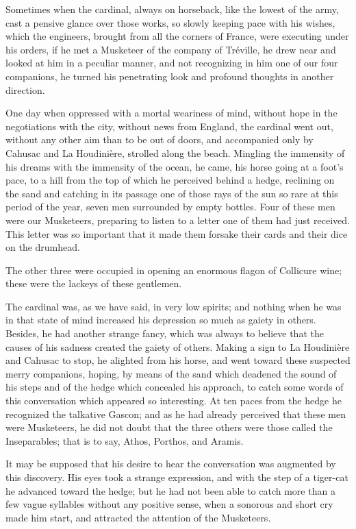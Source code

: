 Sometimes when the cardinal, always on horseback, like the lowest  of the army, cast a pensive glance over those works, so slowly keeping pace with his wishes, which the engineers, brought from all the corners of France, were executing under his orders, if he met a Musketeer of the company of Tréville, he drew near and looked at him in a peculiar manner, and not recognizing in him one of our four companions, he turned his penetrating look and profound thoughts in another direction. 

One day when oppressed with a mortal weariness of mind, without hope in the negotiations with the city, without news from England, the cardinal went out, without any other aim than to be out of doors, and accompanied only by Cahusac and La Houdinière, strolled along the beach. Mingling the immensity of his dreams with the immensity of the ocean, he came, his horse going at a foot's pace, to a hill from the top of which he perceived behind a hedge, reclining on the sand and catching in its passage one of those rays of the sun so rare at this period of the year, seven men surrounded by empty bottles. Four of these men were our Musketeers, preparing to listen to a letter one of them had just received. This letter was so important that it made them forsake their cards and their dice on the drumhead. 

The other three were occupied in opening an enormous flagon of Collicure wine; these were the lackeys of these gentlemen. 

The cardinal was, as we have said, in very low spirits; and nothing when he was in that state of mind increased his depression so much as gaiety in others. Besides, he had another strange fancy, which was always to believe that the causes of his sadness created the gaiety of others. Making a sign to La Houdinière and Cahusac to stop, he alighted from his horse, and went toward these suspected merry companions, hoping, by means of the sand which deadened the sound of his steps and of the hedge which concealed his approach, to catch some words of this conversation which appeared so interesting. At ten paces from the hedge he recognized the talkative Gascon; and as he had already perceived that these men were Musketeers, he did not doubt that the three others were those called the Inseparables; that is to say, Athos, Porthos, and Aramis. 

It may be supposed that his desire to hear the conversation was augmented by this discovery. His eyes took a strange expression, and with the step of a tiger-cat he advanced toward the hedge; but he had not been able to catch more than a few vague syllables without any positive sense, when a sonorous and short cry made him start, and attracted the attention of the Musketeers. 

